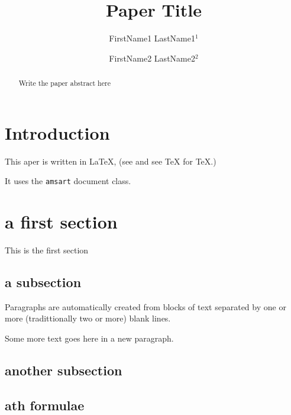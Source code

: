 \documentclass[12pt,reqno,a4paper]{amsart}
\title[paper title]{Paper Title}
\author[F1. LastName1]{FirstName1 LastName1$^1$}
\author[F2. LastName2]{FirstName2 LastName2$^2$}
\begin{document}
\begin{abstract}

Write the paper abstract here

\end{abstract}
\maketitle

\pagestyle{headings}


\cleardoublepage
{} %
\tableofcontents

\section*{Introduction}


This aper is  written in {\LaTeX}, (see \cite{latex2e} and see  {\TeX} \cite{texbook} for {\TeX}.)

It uses the \texttt{amsart} document class.





\section{a first section}
\label{sec:first}

This  is the first section

\subsection{a subsection}

Paragraphs are automatically created from blocks of text separated by one or more (tradittionally two or more)
blank lines.


Some more text goes here in a new paragraph.




\subsection{another subsection}


\subsection{ath formulae}
\end{document}
